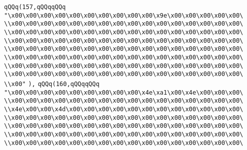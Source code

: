 \verb|qQQq(157,qQQqqQQq|\newline
\verb|"\x00\x00\x00\x00\x00\x00\x00\x00\x00\x00\x9e\x00\x00\x00\x00\x00\|\newline
\verb|\\x00\x00\x00\x00\x00\x00\x00\x00\x00\x00\x00\x00\x00\x00\x00\x00\|\newline
\verb|\\x00\x00\x00\x00\x00\x00\x00\x00\x00\x00\x00\x00\x00\x00\x00\x00\|\newline
\verb|\\x00\x00\x00\x00\x00\x00\x00\x00\x00\x00\x00\x00\x00\x00\x00\x00\|\newline
\verb|\\x00\x00\x00\x00\x00\x00\x00\x00\x00\x00\x00\x00\x00\x00\x00\x00\|\newline
\verb|\\x00\x00\x00\x00\x00\x00\x00\x00\x00\x00\x00\x00\x00\x00\x00\x00\|\newline
\verb|\\x00\x00\x00\x00\x00\x00\x00\x00\x00\x00\x00\x00\x00\x00\x00\x00\|\newline
\verb|\\x00\x00\x00\x00\x00\x00\x00\x00\x00\x00\x00\x00\x00\x00\x00\x00\|\newline
\verb|\\x00"|\newline
\verb|),|\newline
\verb|qQQq(160,qQQqqQQq|\newline
\verb|"\x00\x00\x00\x00\x00\x00\x00\x00\x00\x4e\xa1\x00\x4e\x00\x00\x00\|\newline
\verb|\\x00\x00\x00\x00\x00\x00\x00\x00\x00\x00\x00\x00\x00\x00\x00\x00\|\newline
\verb|\\x4e\x00\x00\x4d\x00\x00\x00\x00\x00\x00\x00\x00\x00\x00\x00\x00\|\newline
\verb|\\x00\x00\x00\x00\x00\x00\x00\x00\x00\x00\x00\x00\x00\x00\x00\x00\|\newline
\verb|\\x00\x00\x00\x00\x00\x00\x00\x00\x00\x00\x00\x00\x00\x00\x00\x00\|\newline
\verb|\\x00\x00\x00\x00\x00\x00\x00\x00\x00\x00\x00\x00\x00\x00\x00\x00\|\newline
\verb|\\x00\x00\x00\x00\x00\x00\x00\x00\x00\x00\x00\x00\x00\x00\x00\x00\|\newline
